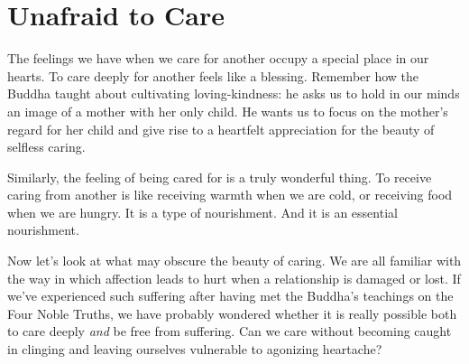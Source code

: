 
\chapter{Unafraid to Care}



The feelings we have when we care for another occupy a special place in
our hearts. To care deeply for another feels like a blessing. Remember
how the Buddha taught about cultivating loving-kindness: he asks us to
hold in our minds an image of a mother with her only child. He wants us
to focus on the mother’s regard for her child and give rise to a
heartfelt appreciation for the beauty of selfless caring.

Similarly, the feeling of being cared for is a truly wonderful thing. To
receive caring from another is like receiving warmth when we are cold,
or receiving food when we are hungry. It is a type of nourishment. And
it is an essential nourishment.

Now let’s look at what may obscure the beauty of caring. We are all
familiar with the way in which affection leads to hurt when a
relationship is damaged or lost. If we’ve experienced such suffering
after having met the Buddha’s teachings on the Four Noble
Truths,\cite{four-noble-truths}
we have probably wondered whether it is really possible both to care deeply
\emph{and} be free from suffering. Can we care without becoming caught in
clinging and leaving ourselves vulnerable to agonizing heartache?

